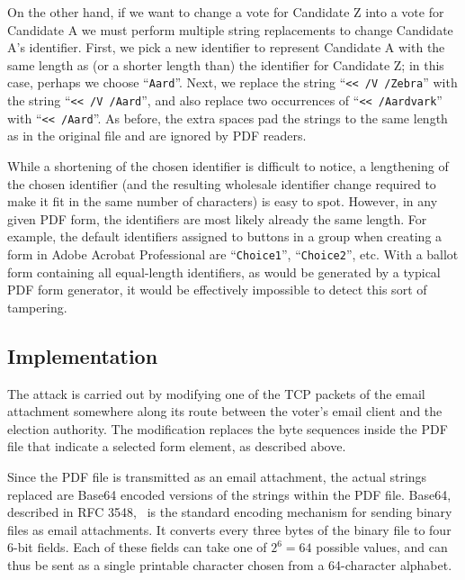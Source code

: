 \documentclass{article}
\newcommand{\etc}{etc.\xspace}
\begin{document}
On the other hand, if we want to change a vote for Candidate Z into a
vote for Candidate A we must perform multiple string replacements to
change Candidate A's identifier.  First, we pick a new identifier to
represent Candidate A with the same length as (or a shorter length
than) the identifier for Candidate Z; in this case, perhaps we choose
``\texttt{Aard}''. Next, we replace the string ``\texttt{<{}< /V
  /Zebra}'' with the string ``\texttt{<{}< /V
  /Aard\textvisiblespace}'', and also replace two occurrences of
``\texttt{<{}< /Aardvark}'' with ``\texttt{<{}<
  /Aard\textvisiblespace\textvisiblespace\textvisiblespace\textvisiblespace}''. As
before, the extra spaces pad the strings to the same length as in the
original file and are ignored by PDF readers.

While a shortening of the chosen identifier is difficult to notice, a
lengthening of the chosen identifier (and the resulting wholesale
identifier change required to make it fit in the same number of
characters) is easy to spot. However, in any given PDF form, the
identifiers are most likely already the same length. For example, the
default identifiers assigned to buttons in a group when creating a
form in Adobe Acrobat Professional are ``\texttt{Choice1}'',
``\texttt{Choice2}'', \etc With a ballot form containing all
equal-length identifiers, as would be generated by a typical PDF form
generator, it would be effectively impossible to detect this sort of
tampering.

\subsection{Implementation}

The attack is carried out by modifying one of the TCP packets of the
email attachment somewhere along its route between the voter's email
client and the election authority. The modification replaces the byte
sequences inside the PDF file that indicate a selected form element,
as described above.

Since the PDF file is transmitted as an email attachment, the actual
strings replaced are Base64 encoded versions of the strings within the
PDF file. Base64, described in RFC 3548,~\cite{RFC3548} is the
standard encoding mechanism for sending binary files as email
attachments. It converts every three bytes of the binary file to four
6-bit fields. Each of these fields can take one of $2^6=64$ possible
values, and can thus be sent as a single printable character chosen
from a 64-character alphabet. 
\end{document}
